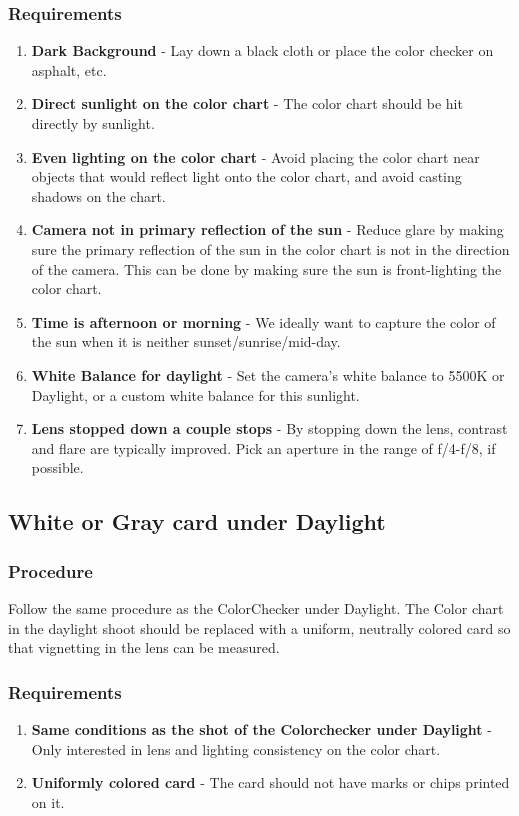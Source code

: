 \documentclass[twoside]{article}
\begin{document}
\subsubsection{Requirements}
\begin{enumerate}
    \item \textbf{Dark Background} - Lay down a black cloth or place the color checker on asphalt, etc.
    \item \textbf{Direct sunlight on the color chart} - The color chart should be hit directly by sunlight.
    \item \textbf{Even lighting on the color chart} - Avoid placing the color chart near objects that would reflect light onto the color chart, and avoid casting shadows on the chart.
    \item \textbf{Camera not in primary reflection of the sun} - Reduce glare by making sure the primary reflection of the sun in the color chart is not in the direction of the camera. This can be done by making sure the sun is front-lighting the color chart.
    \item \textbf{Time is afternoon or morning} - We ideally want to capture the color of the sun when it is neither sunset/sunrise/mid-day.
    \item \textbf{White Balance for daylight} - Set the camera's white balance to 5500K or Daylight, or a custom white balance for this sunlight.
    \item \textbf{Lens stopped down a couple stops} - By stopping down the lens, contrast and flare are typically improved. Pick an aperture in the range of f/4-f/8, if possible.
\end{enumerate}

\subsection{White or Gray card under Daylight}
\subsubsection{Procedure}
Follow the same procedure as the ColorChecker under Daylight. The Color chart in the daylight shoot should be replaced with a uniform, neutrally colored card so that vignetting in the lens can be measured.

\subsubsection{Requirements}
\begin{enumerate}
    \item \textbf{Same conditions as the shot of the Colorchecker under Daylight} - Only interested in lens and lighting consistency on the color chart.
    \item \textbf{Uniformly colored card} - The card should not have marks or chips printed on it.
\end{enumerate}

\end{document}
